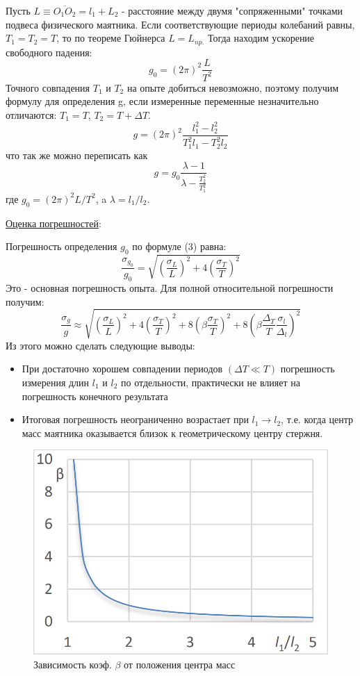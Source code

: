 \documentclass{article}
\begin{document}
\noindent
Пусть $L\equiv\overline{O_1O_2}=l_1+L_2$ - расстояние между двумя "сопряженными" точками подвеса физического маятника. Если соответствующие периоды колебаний равны, $T_1=T_2=T$, то по теореме Гюйнерса $L=L_{np.}$ Тогда находим ускорение свободного падения:
\begin{equation}\label{нср}
g_0 = (2\pi)^2\frac{L}{T^2}
\end{equation} 
Точного совпадения $T_1$ и $T_2$ на опыте добиться невозможно, поэтому получим формулу для определения g, если измеренные переменные незначительно отличаются: $T_1=T$, $T_2 = T+\Delta T$.
\begin{equation}\label{нср}
g = (2\pi)^2\frac{l_1^2-l_2^2}{T_1^2l_1-T_2^2l_2}
\end{equation}
что так же можно переписать как 
\begin{equation}\label{нср}
g = g_0\frac{\lambda -1}{\lambda -\frac{T_2^2}{T_1^2}}
\end{equation}
где $g_0 = (2\pi)^2L/T^2$, a $\lambda = l_1/l_2$.

\noindent
\underline{Оценка погрешностей}:

\noindent
Погрешность определения $g_0$ по формуле (3) равна:
\begin{equation}\label{нср}
\frac{\sigma_{g_0}}{g_0}=\sqrt{(\frac{\sigma_L}{L})^2 + 4(\frac{\sigma_T}{T})^2}
\end{equation}
Это - основная погрешность опыта. Для полной относительной погрешности получим:
\begin{equation}\label{нср}
\frac{\sigma_g}{g}\approx\sqrt{(\frac{\sigma_L}{L})^2 + 4(\frac{\sigma_T}{T})^2 + 8(\beta\frac{\sigma_T}{T})^2 + 8(\beta\frac{\Delta_T}{T}\frac{\sigma_l}{\Delta_l})^2}
\end{equation}
Из этого можно сделать следующие выводы:
\begin{itemize}
    \item При достаточно хорошем совпадении периодов $(\Delta T \ll T)$ погрешность измерения длин $l_1$ и $l_2$ по отдельности, практически не влияет на погрешность конечного результата
    \item Итоговая погрешность неограниченно возрастает при $l_1 \rightarrow l_2$, т.е. когда центр масс маятника оказывается близок к геометрическому центру стержня.
\end{itemize}

\begin{figure}[th!]
    \centering
    \includegraphics[width=0.5\linewidth]{Screenshot_5.png}
    \caption{Зависимость коэф. $\beta$ от положения центра масс}
    \label{fig:enter-label}
\end{figure}
\end{document}
